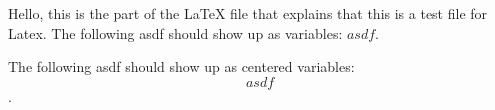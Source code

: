 \documentclass{article}
\title{}
\author{}
\date{}
\begin{document}
\maketitle

Hello, this is the part of the LaTeX file that explains that this is a test file for Latex.
The following asdf should show up as variables: $asdf$.

The following asdf should show up as centered variables: \[asdf\].
\end{document}
